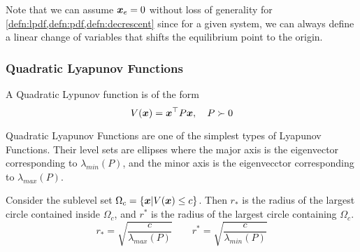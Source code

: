Note that we can assume $\boldsymbol{x}_e = 0$ without loss of generality for
\cref{defn:lpdf,defn:pdf,defn:decrescent} since for a given system, we can always define a linear
change of variables that shifts the equilibrium point to the origin.
\subsubsection{Quadratic Lyapunov Functions}
\begin{definition}
	A Quadratic Lypunov function is of the form \[
		V(\boldsymbol{x}) = \boldsymbol{x}^\top P \boldsymbol{x},\quad P \succ 0
	\]
	\label{defn:quadratic-lyapunov}
\end{definition}
Quadratic Lyapunov Functions are one of the simplest types of Lyapunov
Functions. Their level sets are ellipses where the major axis is the eigenvector
corresponding to $\lambda_{min}(P)$, and the minor axis is the eigenvecctor
corresponding to $\lambda_{max}(P)$.

\begin{theorem}
	Consider the sublevel set $\Omega_c = \{ \boldsymbol{x} | V(\boldsymbol{x}) \leq c \}$. Then
	$r_*$ is the radius of the largest circle contained inside $\Omega_c$, and $r^*$
	is the radius of the largest circle containing $\Omega_c$.
	\[
		r_* = \sqrt{\frac{c}{\lambda_{max}(P)}} \qquad r^* =
		\sqrt{\frac{c}{\lambda_{min}(P)}}
	\]
	\label{thm:quadratic-level-sets}
\end{theorem}

